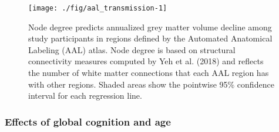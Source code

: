 \documentclass[]{article}
\begin{document}
\begin{figure}

{\centering \texttt{[image: ./fig/aal\_transmission-1]} 

}

\caption{Node degree predicts annualized grey matter volume decline among study participants in regions defined by the Automated Anatomical Labeling (AAL) atlas. Node degree is based on structural connectivity measures computed by Yeh et al. (2018) and reflects the number of white matter connections that each AAL region has with other regions. Shaded areas show the pointwise 95\% confidence interval for each regression line.}\label{fig:aal_transmission}
\end{figure}

\subsubsection*{Effects of global cognition and
age}\label{effects-of-global-cognition-and-age}
\end{document}
